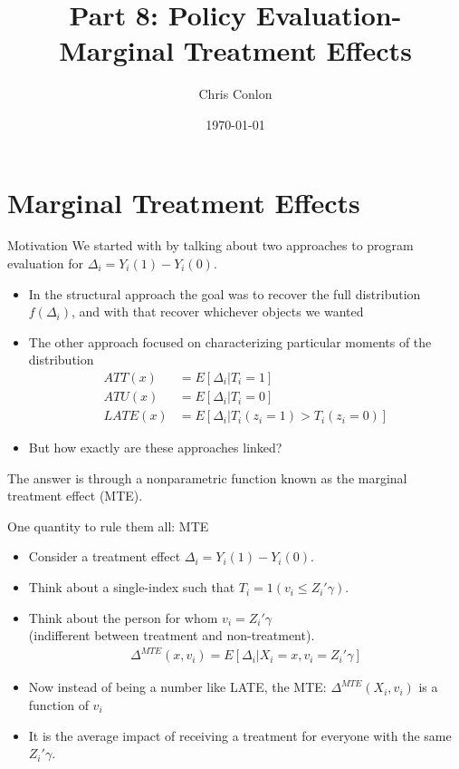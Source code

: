 \documentclass[xcolor=pdftex,dvipsnames,table,mathserif,aspectratio=169]{beamer}
\begin{document}
\title{Part 8: Policy Evaluation- Marginal Treatment Effects}
\author{Chris Conlon}
\date{\today}

\maketitle
\section{Marginal Treatment Effects}


\begin{frame}{Motivation}
We started with by talking about two approaches to program evaluation for $\Delta_i = Y_i(1) - Y_i(0)$.
\begin{itemize}
\item In the \alert{structural approach} the goal was to recover the full distribution $f(\Delta_i)$, and with that recover whichever objects we wanted
\item The other approach focused on characterizing particular moments of the distribution
\begin{align*}
ATT(x) &= E[ \Delta_i | T_{i}=1]\\
ATU(x) &= E[ \Delta_i | T_{i}=0]\\
LATE(x) &= E[ \Delta_i | T_{i}(z_i=1) > T_{i}(z_i = 0)]
\end{align*}

\item But how exactly are these approaches linked?
\end{itemize}
The answer is through a \alert{nonparametric function} known as the \alert{marginal treatment effect} (MTE).
\end{frame}

\begin{frame}{One quantity to rule them all: MTE}
\begin{itemize}
\item Consider a treatment effect $\Delta_i = Y_{i}(1) - Y_{i}(0)$.
\item Think about a single-index such that $T_i = 1(v_i \leq Z_i' \gamma)$.
\item Think about the person for whom $v_i = Z_i'\gamma$\\
 (indifferent between treatment and non-treatment).
\begin{eqnarray*}
\Delta^{MTE}(x, v_i) = E[\Delta_i | X_i=x, v_i = Z_i'\gamma] 
\end{eqnarray*}
\item Now instead of being \alert{a number} like LATE, the MTE: $\Delta^{MTE}(X_i, v_i)$ is a \alert{function} of $v_i$
\item It is the average impact of receiving a treatment for everyone with the same $Z_i' \gamma$.
\end{itemize}
\end{frame}
\end{document}
